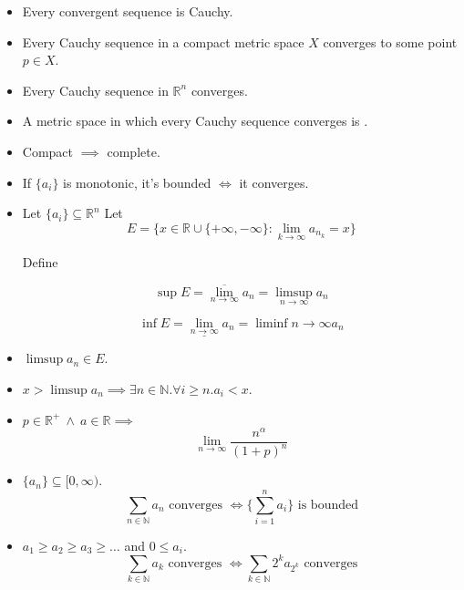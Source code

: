 \documentclass[11pt]{article}
\newcommand{\nat}{\mathbb{N}}
\newcommand{\reals}{\mathbb{R}}
\newcommand{\boxinate}[1]{\framebox[1.1\width]{#1}}
\newcommand{\tand}{~\land~}
\begin{document}
\begin{itemize}
\item Every convergent sequence is Cauchy.

\item Every Cauchy sequence in a compact metric space $X$ converges to some
  point $p \in X$.

\item Every Cauchy sequence in $\reals^n$ converges.

\item A metric space in which every Cauchy sequence converges is
  \boxinate{complete}.

\item Compact $\implies$ complete.

\item If $\{a_i\}$ is monotonic, it's bounded $\iff$ it converges.

\item Let $\{a_i\} \subseteq \reals^n$ Let
  $$E = \{x \in \reals \cup \{+\infty, -\infty\} : \lim_{k\rightarrow \infty}
  a_{n_k} = x\}$$

  Define

  $$\sup E = \overline{\lim_{n\rightarrow\infty}} a_n = \limsup_{n\rightarrow
    \infty} a_n$$

  $$\inf E = \underline{\lim_{n\rightarrow\infty}} a_n = \liminf{n\rightarrow
    \infty} a_n$$

\item $\limsup a_n \in E$.

\item $x > \limsup a_n \implies \exists n \in \nat . \forall i \geq n . a_i <
  x$.

\item $p \in \reals^+ \tand a \in \reals \implies$
  $$\lim_{n \rightarrow \infty} \frac{n^\alpha}{(1+p)^n}$$

\item $\{a_n\} \subseteq [0, \infty)$.
  $$\sum_{n \in \nat} a_n\text{ converges }\iff \{\sum_{i=1}^n a_i\} \text{ is
    bounded}$$

\item $a_1 \geq a_2 \geq a_3 \geq \ldots$ and $0 \leq a_i$.
  $$\sum_{k \in \nat} a_k \text{ converges } \iff \sum_{k \in \nat} 2^k a_{2^k}
  \text{ converges}$$

\end{itemize}

\end{document}
